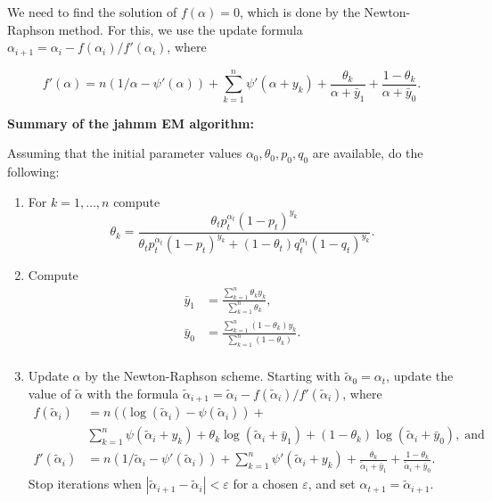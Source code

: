 \documentclass[12pt]{article}
\begin{document}
\begin{appendices}
    We need to find the solution of $f(\alpha) = 0$, which is done by
    the Newton-Raphson method. For this, we use the update formula
    $\alpha_{i+1} = \alpha_i - f(\alpha_i)/f'(\alpha_i)$, where

    \begin{equation*}
      f'(\alpha) = n \left( 1/\alpha - \psi'(\alpha) \right) +
      \sum_{k=1}^n \psi'(\alpha+y_k) +
      \frac{\theta_k}{\alpha+\bar{y}_1} +
      \frac{1-\theta_k}{\alpha + \bar{y}_0}.
    \end{equation*}

\noindent
    \textbf{Summary of the jahmm EM algorithm:} \par
    Assuming that the initial parameter values
    $\alpha_0, \theta_0, p_0, q_0$ are available, do the following:

    \begin{enumerate}

      \item For $k = 1, \ldots , n$ compute
        \begin{equation*}
        \theta_k = \frac{\theta_t p_t^{\alpha_t}(1-p_t)^{y_k}}
        {\theta_t p_t^{\alpha_t}(1-p_t)^{y_k} + (1-\theta_t)
         q_t^{\alpha_t}(1-q_t)^{y_k}}.
        \end{equation*}

      \item Compute
        \begin{align*}
        \bar{y}_1 &= \frac{\sum_{k=1}^n \theta_k y_k}
          {\sum_{k=1}^n \theta_k}, \\
        \bar{y}_0 &= \frac{\sum_{k=1}^n (1-\theta_k) y_k}
          {\sum_{k=1}^n (1-\theta_k)}. \\
        \end{align*}

      \item Update $\alpha$ by the Newton-Raphson scheme. Starting
        with $\tilde{\alpha}_{0} = \alpha_t$,
        update the value of $\tilde{\alpha}$
        with the formula
        $\tilde{\alpha}_{i+1} = \tilde{\alpha}_i -
        f(\tilde{\alpha}_i)/f'(\tilde{\alpha}_i)$, where
        \begin{align*}
          f(\tilde{\alpha}_i) &= n \left( (\log(\tilde{\alpha}_i) -
          \psi(\tilde{\alpha}_i) \right) + \\
          &\sum_{k=1}^n \psi(\tilde{\alpha}_i+y_k) +
          \theta_k \log(\tilde{\alpha}_i + \bar{y}_1)
          + (1-\theta_k) \log(\tilde{\alpha}_i + \bar{y}_0),
          \; \text{and} \\
          f'(\tilde{\alpha}_i) &= n \left( 1/\tilde{\alpha}_i -
          \psi'(\tilde{\alpha}_i) \right) +
          \sum_{k=1}^n \psi'(\tilde{\alpha}_i+y_k) +
          \frac{\theta_k}{\tilde{\alpha}_i+\bar{y}_1} +
          \frac{1-\theta_k}{\tilde{\alpha}_i + \bar{y}_0}.
        \end{align*}
        Stop iterations when
        $|\tilde{\alpha}_{i+1} - \tilde{\alpha}_i| < \varepsilon$ for
        a chosen $\varepsilon$, and set $\alpha_{t+1} =
        \tilde{\alpha}_{i+1}$.


\end{enumerate}
\end{appendices}
\end{document}
